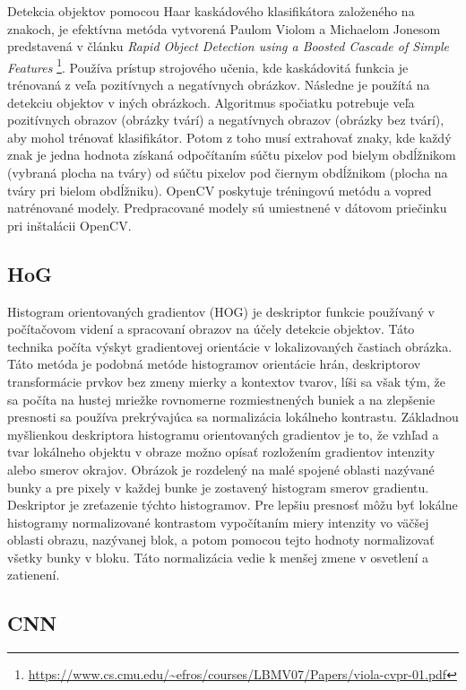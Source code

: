 \documentclass[]{article}
\begin{document}
	Detekcia objektov pomocou Haar kaskádového klasifikátora založeného na znakoch, je efektívna metóda vytvorená Paulom Violom a Michaelom Jonesom predstavená v článku \textit{Rapid Object Detection using a Boosted Cascade of Simple Features} \footnote{\url{https://www.cs.cmu.edu/~efros/courses/LBMV07/Papers/viola-cvpr-01.pdf}}. Používa prístup strojového učenia, kde kaskádovitá funkcia je trénovaná z veľa pozitívnych a negatívnych obrázkov. Následne je použítá na detekciu objektov v iných obrázkoch. Algoritmus spočiatku potrebuje veľa pozitívnych obrazov (obrázky tvárí) a negatívnych obrazov (obrázky bez tvárí), aby mohol trénovať klasifikátor. Potom z toho musí extrahovať znaky, kde každý znak je jedna hodnota získaná odpočítaním súčtu pixelov pod bielym obdĺžnikom (vybraná plocha na tváry) od súčtu pixelov pod čiernym obdĺžnikom (plocha na tváry pri bielom obdĺžniku). OpenCV poskytuje tréningovú metódu a vopred natrénované modely. Predpracované modely sú umiestnené v dátovom priečinku pri inštalácii OpenCV.
	
	\subsection*{HoG}
	
	Histogram orientovaných gradientov (HOG) je deskriptor funkcie používaný v počítačovom videní a spracovaní obrazov na účely detekcie objektov. Táto technika počíta výskyt gradientovej orientácie v lokalizovaných častiach obrázka. Táto metóda je podobná metóde histogramov orientácie hrán, deskriptorov transformácie prvkov bez zmeny mierky a kontextov tvarov, líši sa však tým, že sa počíta na hustej mriežke rovnomerne rozmiestnených buniek a na zlepšenie presnosti sa používa prekrývajúca sa normalizácia lokálneho kontrastu. Základnou myšlienkou deskriptora histogramu orientovaných gradientov je to, že vzhľad a tvar lokálneho objektu v obraze možno opísať rozložením gradientov intenzity alebo smerov okrajov. Obrázok je rozdelený na malé spojené oblasti nazývané bunky a pre pixely v každej bunke je zostavený histogram smerov gradientu. Deskriptor je zreťazenie týchto histogramov. Pre lepšiu presnosť môžu byť lokálne histogramy normalizované kontrastom vypočítaním miery intenzity vo väčšej oblasti obrazu, nazývanej blok, a potom pomocou tejto hodnoty normalizovať všetky bunky v bloku. Táto normalizácia vedie k menšej zmene v osvetlení a zatienení.
	
	\subsection*{CNN}
	
\end{document}
